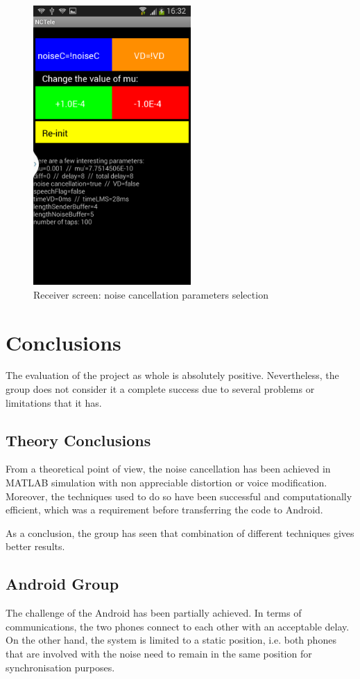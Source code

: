 \documentclass[11pt,a4paper,english]{book}  %
\theoremstyle{definition}  %
\theoremstyle{plain}  %
\theoremstyle{remark}  %
\begin{document}
		\begin{figure}[h]
		\centering
		\includegraphics[width=6cm]{images/android/receiverscreen.jpg}
		\caption{Receiver screen: noise cancellation parameters selection}
		\label{fig:receiver}
		\end{figure}
	

\chapter{Conclusions}

The evaluation of the project as whole is absolutely positive. Nevertheless, the group does not consider it a complete success due to several problems or limitations that it has.


\section{Theory Conclusions}
From a theoretical point of view, the noise cancellation has been achieved in MATLAB simulation with non appreciable distortion or voice modification. Moreover, the techniques used to do so have been successful and computationally efficient, which was a requirement before transferring the code to Android.

As a conclusion, the group has seen that combination of different techniques gives better results.

\section{Android Group}
The challenge of the Android has been partially achieved. In terms of communications, the two phones connect to each other with an acceptable delay. On the other hand, the system is limited to a static position, i.e. both phones that are involved with the noise need to remain in the same position for synchronisation purposes.
\end{document}
